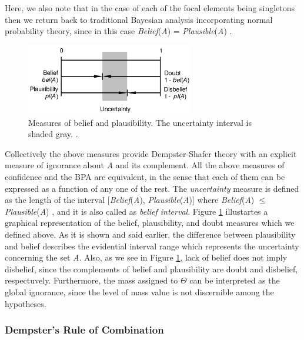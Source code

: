 \documentclass[11pt]{article}
\begin{document}
Here, we also note that in the case of each of the focal elements being
singletons then we return back to traditional Bayesian analysis incorporating
normal probability theory, since in this case \textit{Belief}(\textit{A}) =
\textit{Plausible}(\textit{A}) \cite{beynon:dst-alternative-decision}.

\begin{figure}[tbh]
  \center
  \includegraphics[width=0.65\textwidth]{figure/uncertainty.png}
  \caption{Measures of belief and plausibility. The uncertainty interval is
  shaded gray. \cite{kay:dst-reliability}.}
  \label{fig:uncertainty}
\end{figure}

Collectively the above measures provide Dempster-Shafer theory with an explicit
measure of ignorance about \textit{A} and its complement. All the above measures
of confidence and the BPA are equivalent, in the sense that each of them can be
expressed as a function of any one of the rest. The \textit{uncertainty}
measure is defined as the length of the interval [\textit{Belief}(\textit{A}),
\textit{Plausible}(\textit{A})] where \textit{Belief}(\textit{A}) $\leqslant$
\textit{Plausible}(\textit{A}) \cite{yager:dst-combination-rules}, and it is
also called as \textit{belief interval}. Figure \ref{fig:uncertainty}
illustartes a graphical representation of the belief, plausibility, and doubt
measures which we defined above. As it is shown and said earlier, the difference
between plausibility and belief describes the evidential interval range which
represents the uncertainty concerning the set \textit{A}. Also, as we see in
Figure \ref{fig:uncertainty}, lack of belief does not imply disbelief, since the
complements of belief and plausibility are doubt and disbelief, respectuvely.
Furthermore, the mass assigned to $\Theta$ can be interpreted as the global
ignorance, since the level of mass value is not discernible among the
hypotheses.

\subsubsection{Dempster's Rule of Combination}
\end{document}
